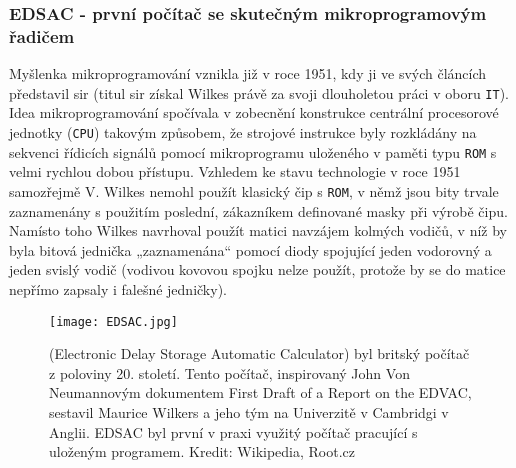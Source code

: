       \subsubsection{EDSAC - první počítač se skutečným mikroprogramovým řadičem}
        Myšlenka mikroprogramování vznikla již v roce 1951, kdy ji ve svých článcích představil sir 
        \wikiEWilkes (titul sir získal Wilkes právě za svoji dlouholetou práci v oboru 
        \texttt{IT}). Idea mikroprogramování spočívala v zobecnění konstrukce centrální procesorové 
        jednotky (\texttt{CPU}) takovým způsobem, že strojové instrukce byly rozkládány na sekvenci 
        řídicích signálů pomocí mikroprogramu uloženého v paměti typu \texttt{ROM} s velmi rychlou 
        dobou přístupu. Vzhledem ke stavu technologie v roce 1951 samozřejmě V. Wilkes nemohl 
        použít klasický čip s \texttt{ROM}, v němž jsou bity trvale zaznamenány s použitím 
        poslední, zákazníkem definované masky při výrobě čipu. Namísto toho Wilkes navrhoval použít 
        matici navzájem kolmých vodičů, v níž by byla bitová jednička „zaznamenána“ pomocí diody 
        spojující jeden vodorovný a jeden svislý vodič (vodivou kovovou spojku nelze použít, 
        protože by se do matice nepřímo zapsaly i falešné jedničky).
        
        \begin{figure}[ht!]   %
          \centering
          \texttt{[image: EDSAC.jpg]}
          \caption{\wikiEDSAC (Electronic Delay Storage Automatic Calculator) byl britský počítač z 
                   poloviny 20. století. Tento počítač, inspirovaný John Von Neumannovým dokumentem 
                   First Draft of a Report on the EDVAC, sestavil Maurice Wilkers a jeho tým na 
                   Univerzitě v Cambridgi v Anglii. EDSAC byl první v praxi využitý počítač 
                   pracující s uloženým programem. Kredit: Wikipedia, Root.cz}
          \label{MIT:fig_edsac}
        \end{figure}
        
